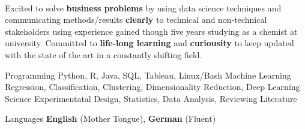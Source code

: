 

\\
  \begin{cvparagraph}
Excited to solve \textbf{business problems} by using data science techniques and communicating
methods/results \textbf{clearly} to technical and non-technical stakeholders using experience gained though five
years studying as a chemist at university. Committed to \textbf{life-long learning}
and \textbf{curiousity} to keep updated with the state of the art in a constantly shifting
field.
  \end{cvparagraph}

  \begin{cvskills}
    \cvskill
      {Programming} %
      {Python, R, Java, SQL, Tableau, Linux/Bash} %
    \cvskill
      {Machine Learning} %
      {Regression, Classification, Clustering, Dimensionality Reduction, Deep Learning} %
    \cvskill
      {Science} %
      {Experimentatal Design, Statistics, Data Analysis, Reviewing Literature} %


    \cvskill
      {Languages} %
      {\textbf{English} (Mother Tongue), \textbf{German} (Fluent)} %

  \end{cvskills}
